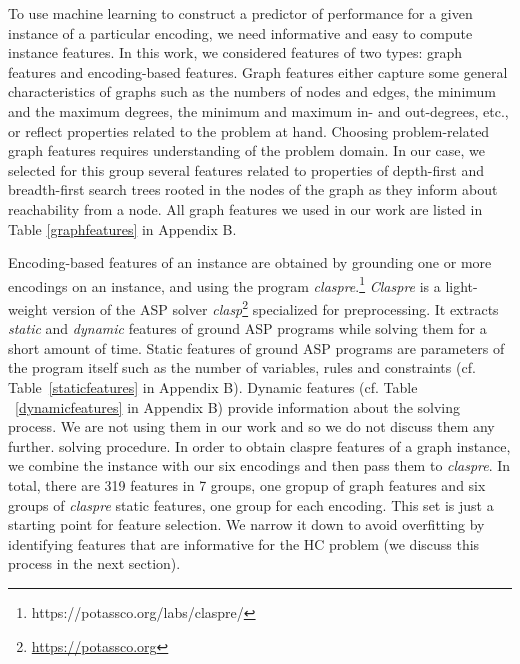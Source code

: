 \documentclass{new_tlp}
\begin{document}
To use machine learning to construct a predictor of performance for a given 
instance of a particular encoding, we need informative and easy to compute 
instance features. In this work, we considered features of two types: graph
features and encoding-based features. Graph features either capture some
general characteristics of graphs such as the numbers of nodes and edges, the 
minimum and the maximum degrees, the minimum and maximum in- and out-degrees, 
etc., or reflect properties related to the problem at hand. Choosing 
problem-related graph features requires understanding of the problem domain. 
In our case, we selected for this group several features related to properties
of depth-first and breadth-first search trees rooted in the nodes of the graph
as they inform about reachability from a node. All graph features we used in 
our work are listed in Table \ref{graphfeatures} in Appendix B. 

Encoding-based features of an instance are obtained by grounding one or more 
encodings on an instance, and using the program 
\emph{claspre}.\footnote{https://potassco.org/labs/claspre/}
\emph{Claspre} is a light-weight version of the ASP solver 
\textit{clasp}\footnote{\url{https://potassco.org}} specialized for 
preprocessing. It extracts \emph{static} and \emph{dynamic} 
features of ground ASP programs while solving them for a short amount of time.
Static features of ground ASP programs are parameters of the program itself
such as the number of variables, rules and constraints (cf. 
Table~\ref{staticfeatures} in Appendix B). Dynamic features 
(cf. Table ~\ref{dynamicfeatures} in Appendix B) 
provide information about
the solving process. We are not using them in our work and so we do not 
discuss them any further.
solving procedure. In order to obtain claspre features of a graph 
instance, we combine the instance with our six encodings and then pass them 
to \textit{claspre}. 
In total, there are 319 %
features in 7%
groups, one gropup of graph features and six groups of \textit{claspre}
static %
features, one group for each encoding. This set is just a starting point for feature selection.
We narrow it down to avoid overfitting by identifying features that are
informative for the HC problem (we discuss this process in the next section).
\end{document}
